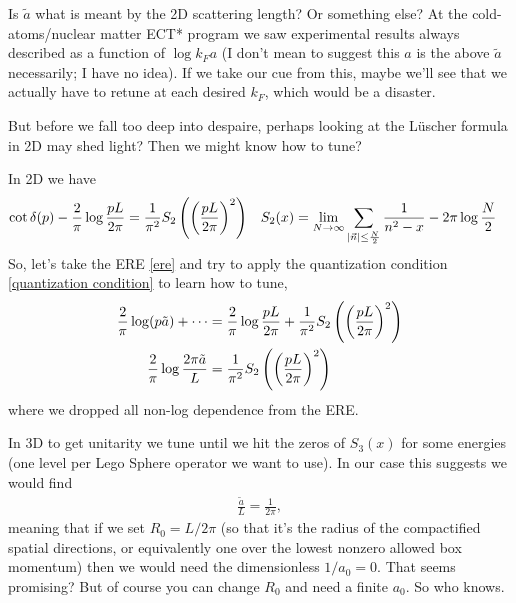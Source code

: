Is $\tilde{a}$ what is meant by the 2D scattering length?  Or something else?
At the cold-atoms/nuclear matter ECT* program we saw experimental results always described as a function of $\log k_F a$ (I don't mean to suggest this $a$ is the above $\tilde{a}$ necessarily; I have no idea).
If we take our cue from this, maybe we'll see that we actually have to retune at each desired $k_F$, which would be a disaster.

But before we fall too deep into despaire, perhaps looking at the L\"{u}scher formula in 2D may shed light?
Then we might know how to tune?

In 2D we have
\begin{align}
	\cot \delta(p) - \frac{2}{\pi} \log \frac{pL}{2\pi} &= \frac{1}{\pi^2} S_2\left(\left(\frac{pL}{2\pi}\right)^2\right)
	&	
	S_2(x) &= \lim_{N\rightarrow\infty} \sum_{\left| \vec{n} \right| \leq \frac{N}{2}} \frac{1}{n^2-x} - 2\pi \log \frac{N}{2}
	\label{eq:quantization condition}
\end{align}
So, let's take the ERE \eqref{ere} and try to apply the quantization condition \eqref{quantization condition} to learn how to tune,
\begin{align}
	\frac{2}{\pi} \log(p \tilde{a}) + \cdots
	&=
	\frac{2}{\pi} \log \frac{pL}{2\pi} + \frac{1}{\pi^2} S_2\left(\left(\frac{pL}{2\pi}\right)^2\right)
	\\
	\frac{2}{\pi} \log \frac{2\pi \tilde{a}}{L} &= \frac{1}{\pi^2} S_2\left(\left(\frac{pL}{2\pi}\right)^2\right)
\end{align}
where we dropped all non-log dependence from the ERE.

In 3D to get unitarity we tune until we hit the zeros of $S_3(x)$ for some energies (one level per Lego Sphere operator we want to use).
In our case this suggests we would find
\begin{align}
	\frac{\tilde{a}}{L} = \frac{1}{2\pi},
\end{align}
meaning that if we set $R_0=L/2\pi$ (so that it's the radius of the compactified spatial directions, or equivalently one over the lowest nonzero allowed box momentum) then we would need the dimensionless $1/a_0 = 0$.
That seems promising?
But of course you can change $R_0$ and need a finite $a_0$.
So who knows.
